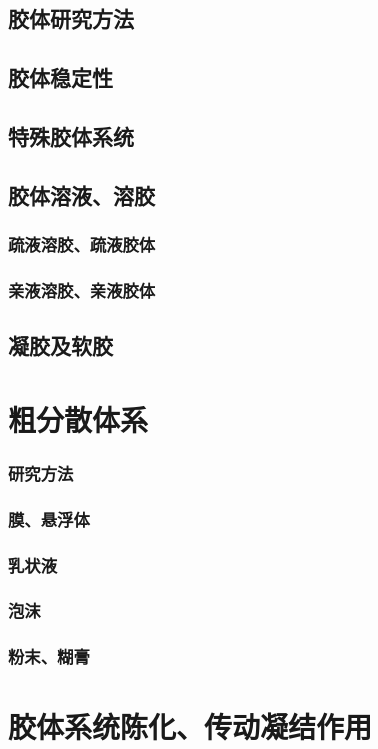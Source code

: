 \documentclass[UTF8]{../03-Chemistry}
\begin{document}
    \subsection{胶体研究方法}
    \subsection{胶体稳定性}
    \subsection{特殊胶体系统}
    \subsection{胶体溶液、溶胶}
        \subsubsection{疏液溶胶、疏液胶体}
        \subsubsection{亲液溶胶、亲液胶体}
    \subsection{凝胶及软胶}
\section{粗分散体系}
    \subsubsection{研究方法}
    \subsubsection{膜、悬浮体}
    \subsubsection{乳状液}
    \subsubsection{泡沫}
    \subsubsection{粉末、糊膏}
\section{胶体系统陈化、传动凝结作用}
\end{document}
